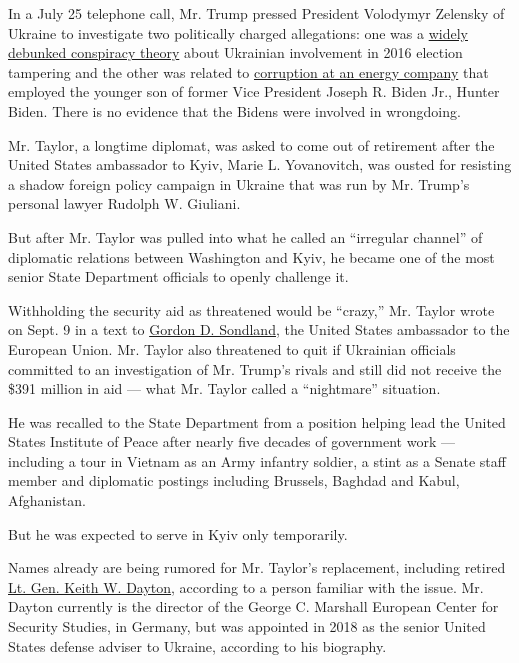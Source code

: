 In a July 25 telephone call, Mr. Trump pressed President Volodymyr
Zelensky of Ukraine to investigate two politically charged allegations:
one was a
\href{https://www.nytimes.com/2019/10/05/us/politics/pompeo-defends-trumps-ukraine-conspiracy-theory.html}{widely
debunked conspiracy theory} about Ukrainian involvement in 2016 election
tampering and the other was related to
\href{https://www.nytimes.com/2019/09/22/us/politics/biden-ukraine-trump.html?module=inline}{corruption
at an energy company} that employed the younger son of former Vice
President Joseph R. Biden Jr., Hunter Biden. There is no evidence that
the Bidens were involved in wrongdoing.

Mr. Taylor, a longtime diplomat, was asked to come out of retirement
after the United States ambassador to Kyiv, Marie L. Yovanovitch, was
ousted for resisting a shadow foreign policy campaign in Ukraine that
was run by Mr. Trump's personal lawyer Rudolph W. Giuliani.

But after Mr. Taylor was pulled into what he called an ``irregular
channel'' of diplomatic relations between Washington and Kyiv, he became
one of the most senior State Department officials to openly challenge
it.

Withholding the security aid as threatened would be ``crazy,'' Mr.
Taylor wrote on Sept. 9 in a text to
\href{https://www.nytimes.com/2019/11/13/us/politics/impeachment-hearings.html}{Gordon
D. Sondland}, the United States ambassador to the European Union. Mr.
Taylor also threatened to quit if Ukrainian officials committed to an
investigation of Mr. Trump's rivals and still did not receive the \$391
million in aid --- what Mr. Taylor called a ``nightmare'' situation.

He was recalled to the State Department from a position helping lead the
United States Institute of Peace after nearly five decades of government
work --- including a tour in Vietnam as an Army infantry soldier, a
stint as a Senate staff member and diplomatic postings including
Brussels, Baghdad and Kabul, Afghanistan.

But he was expected to serve in Kyiv only temporarily.

Names already are being rumored for Mr. Taylor's replacement, including
retired
\href{https://www.marshallcenter.org/MCPUBLICWEB/en/nav-itemid-fix-bios-en/104-cat-bios-command-en/977-art-bio-dayton-keith-en.html}{Lt.
Gen. Keith W. Dayton}, according to a person familiar with the issue.
Mr. Dayton currently is the director of the George C. Marshall European
Center for Security Studies, in Germany, but was appointed in 2018 as
the senior United States defense adviser to Ukraine, according to his
biography.


